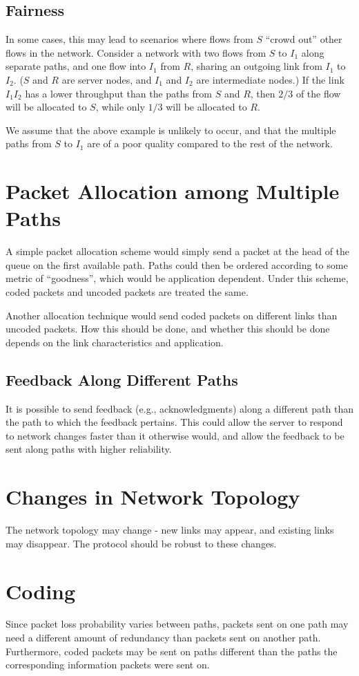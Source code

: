 \documentclass{article}
\begin{document}
\subsection{Fairness}
In some cases, this may lead to scenarios where flows from $S$ ``crowd out'' other flows in the network.  Consider a network with two flows from $S$ to $I_1$ along separate paths, and one flow into $I_1$ from $R$, sharing an outgoing link from $I_1$ to $I_2$.  ($S$ and $R$ are server nodes, and $I_1$ and $I_2$ are intermediate nodes.)  If the link $I_1I_2$ has a lower throughput than the paths from $S$ and $R$, then $2/3$ of the flow will be allocated to $S$, while only $1/3$ will be allocated to $R$.  

We assume that the above example is unlikely to occur, and that the multiple paths from $S$ to $I_1$ are of a poor quality compared to the rest of the network.

\section{Packet Allocation among Multiple Paths}
A simple packet allocation scheme would simply send a packet at the head of the queue on the first available path.  Paths could then be ordered according to some metric of ``goodness'', which would be application dependent.  Under this scheme, coded packets and uncoded packets are treated the same.

Another allocation technique would send coded packets on different links than uncoded packets.  How this should be done, and whether this should be done depends on the link characteristics and application.

\subsection{Feedback Along Different Paths}
It is possible to send feedback (e.g., acknowledgments) along a different path than the path to which the feedback pertains.  This could allow the server to respond to network changes faster than it otherwise would, and allow the feedback to be sent along paths with higher reliability. 


\section{Changes in Network Topology}
The network topology may change - new links may appear, and existing links may disappear.  The protocol should be robust to these changes.

\section{Coding}
Since packet loss probability varies between paths, packets sent on one path may need a different amount of redundancy than packets sent on another path.  Furthermore, coded packets may be sent on paths different than the paths the corresponding information packets were sent on.
\end{document}
